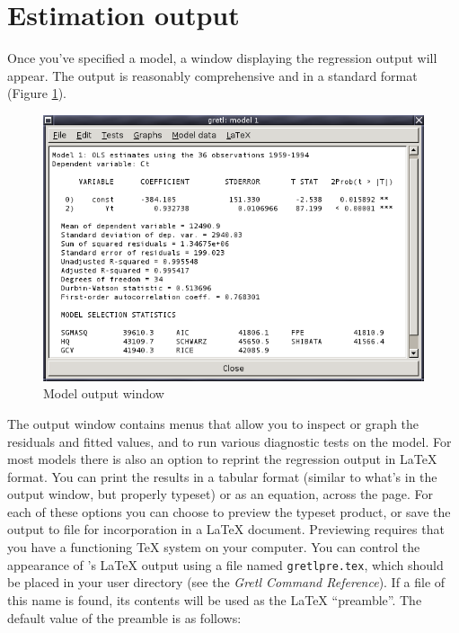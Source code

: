 \section{Estimation output}
\label{est-output}


Once you've specified a model, a window displaying the regression
output will appear.  The output is reasonably comprehensive and in a
standard format (Figure \ref{fig-modelwin}).
    
\begin{figure}[htbp]
  \caption{Model output window}
  \label{fig-modelwin}
  \begin{center}
    \includegraphics[scale=0.5]{figures/modelwin}
  \end{center}
\end{figure}
The output window contains menus that allow you to inspect or graph
the residuals and fitted values, and to run various diagnostic tests
on the model.  For most models there is also an option to reprint the
regression output in {\LaTeX} format.  You can print the results in a
tabular format (similar to what's in the output window, but properly
typeset) or as an equation, across the page.  For each of these
options you can choose to preview the typeset product, or save the
output to file for incorporation in a {\LaTeX} document.  Previewing
requires that you have a functioning {\TeX} system on your computer.
You can control the appearance of 's {\LaTeX} output using
a file named \verb+gretlpre.tex+, which should be placed in your
 user directory (see the \emph{Gretl Command Reference}).
If a file of this name is found, its contents will be used as the
{\LaTeX} ``preamble''. The default value of the preamble is as
follows:
    
